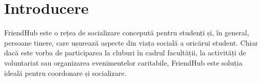 \chapter*{Introducere} 
FriendHub este o rețea de socializare concepută pentru studenți și, în general, persoane tinere, care ușurează aspecte din viața socială a oricărui student. Chiar dacă este vorba de participarea la cluburi în cadrul facultății, la activități de voluntariat sau organizarea evenimentelor caritabile, FriendHub este soluția ideală pentru coordonare și socializare.
\newpage